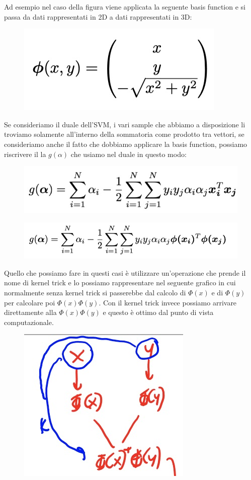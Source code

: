 \documentclass[14pt]{extreport}
\begin{document}
Ad esempio nel caso della figura viene applicata la seguente basis function e si passa da dati rappresentati in 2D a dati rappresentati in 3D:

\begin{figure}[H]
\centering
\includegraphics[width=0.3\linewidth]{333.jpeg}
\end{figure}

Se consideriamo il duale dell'SVM, i vari sample che abbiamo a disposizione li troviamo solamente all'interno della sommatoria come prodotto tra
vettori, se consideriamo anche il fatto che dobbiamo applicare la basis function, possiamo riscrivere il la $g(\alpha)$ che usiamo nel duale in questo
modo:

\begin{figure}[H]
\centering
\includegraphics[width=0.5\linewidth]{334.jpeg}
\end{figure}
\begin{figure}[H]
\centering
\includegraphics[width=0.5\linewidth]{335.jpeg}
\end{figure}

Quello che possiamo fare in questi casi è utilizzare un'operazione che prende il nome di kernel trick e lo possiamo rappresentare nel seguente grafico
in cui normalmente senza kernel trick si passerebbe dal calcolo di $\Phi(x)$ e di $\Phi(y)$ per calcolare poi $\Phi(x)\Phi(y)$. Con il kernel trick
invece possiamo arrivare direttamente alla $\Phi(x)\Phi(y)$ e questo è ottimo dal punto di vista computazionale.

\begin{figure}[H]
\centering
\includegraphics[width=0.3\linewidth]{346.jpeg}
\end{figure}
\end{document}
